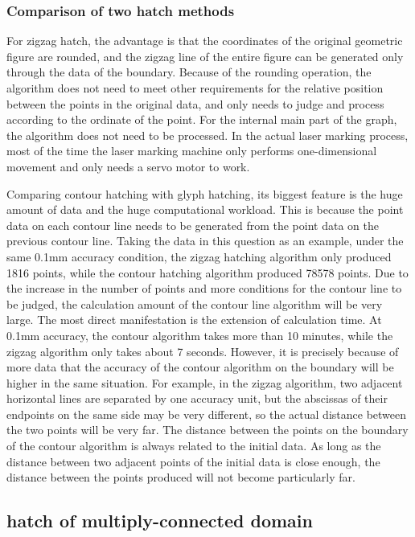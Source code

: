 \documentclass{apmcmthesis}
\begin{document}
\subsubsection{Comparison of two hatch methods}

For zigzag hatch, the advantage is that the coordinates of the original geometric figure are rounded, and the zigzag line of the entire figure can be generated only through the data of the boundary. Because of the rounding operation, the algorithm does not need to meet other requirements for the relative position between the points in the original data, and only needs to judge and process according to the ordinate of the point. For the internal main part of the graph, the algorithm does not need to be processed. In the actual laser marking process, most of the time the laser marking machine only performs one-dimensional movement and only needs a servo motor to work.


Comparing contour hatching with glyph hatching, its biggest feature is the huge amount of data and the huge computational workload. This is because the point data on each contour line needs to be generated from the point data on the previous contour line. Taking the data in this question as an example, under the same 0.1mm accuracy condition, the zigzag hatching algorithm only produced 1816 points, while the contour hatching algorithm produced 78578 points. Due to the increase in the number of points and more conditions for the contour line to be judged, the calculation amount of the contour line algorithm will be very large. The most direct manifestation is the extension of calculation time. At 0.1mm accuracy, the contour algorithm takes more than 10 minutes, while the zigzag algorithm only takes about 7 seconds. However, it is precisely because of more data that the accuracy of the contour algorithm on the boundary will be higher in the same situation. For example, in the zigzag algorithm, two adjacent horizontal lines are separated by one accuracy unit, but the abscissas of their endpoints on the same side may be very different, so the actual distance between the two points will be very far. The distance between the points on the boundary of the contour algorithm is always related to the initial data. As long as the distance between two adjacent points of the initial data is close enough, the distance between the points produced will not become particularly far.


\subsection{hatch of multiply-connected domain}
\end{document}
